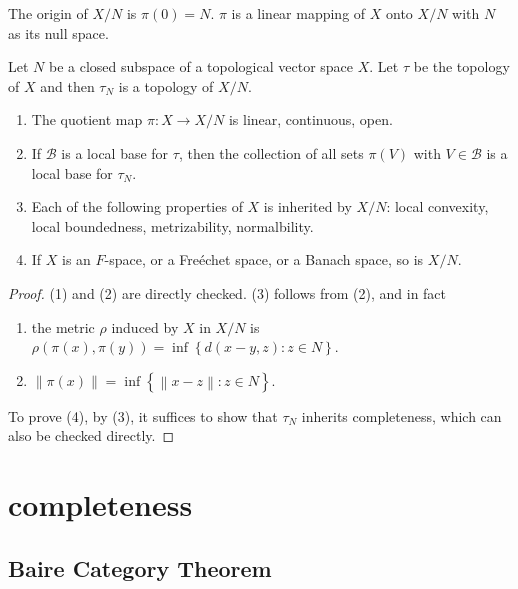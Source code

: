 \begin{remark}
  \label{remark-quotient-null-space}
  The origin of \( X / N \) is \( \pi(0) = N \).
  \( \pi \) is a linear mapping of \( X \) onto \( X / N \) with \( N \) as its null space.
\end{remark}

\begin{theorem}
  Let \( N \) be a closed subspace of a topological vector space \( X \).
  Let \( \tau \) be the topology of \( X \) and then \( \tau_N \) is a topology of \( X / N \).
  \begin{enumerate}
    \item The quotient map \( \pi: X \to X / N \) is linear, continuous, open.
    \item If \( \mathcal{B} \) is a local base for \( \tau \), then the collection of all sets \( \pi(V) \) with \( V \in \mathcal{B} \) is a local base for \( \tau_N \).
    \item Each of the following properties of \( X \) is inherited by \( X / N \):  local convexity, local boundedness, metrizability, normalbility.
    \item If \( X \) is an \( F \)-space, or a Fre\'{e}chet space, or a Banach space, so is \( X / N \).
  \end{enumerate}
\end{theorem}
\begin{proof}
  (1) and (2) are directly checked.
  (3) follows from (2), and in fact
  \begin{enumerate}
    \item the metric \( \rho \) induced by \( X \) in \( X / N \) is \( \rho(\pi(x), \pi(y)) = \inf \left\lbrace d(x - y, z): z \in N \right\rbrace \).
    \item \( \left\lVert \pi(x) \right\rVert = \inf \left\lbrace \left\lVert x - z \right\rVert: z \in N \right\rbrace \).
  \end{enumerate}
  To prove (4), by (3), it suffices to show that \( \tau_N \) inherits completeness, which can also be checked directly.
\end{proof}

\section{completeness}
\label{section-completeness}

\subsection{Baire Category Theorem}
\label{subsection-Baire-category-theorem}


